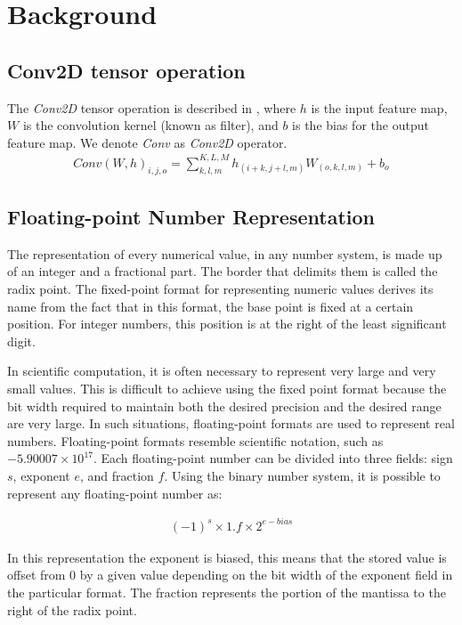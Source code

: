 \section{Background}
\label{sec:background}

\subsection{Conv2D tensor operation}
The \emph{Conv2D} tensor operation is described in , where $h$ is the input feature map, $W$ is the convolution kernel (known as filter), and $b$ is the bias for the output feature map\cite{goodfellow2016deep}. We denote \emph{Conv} as \emph{Conv2D} operator.
\begin{eqnarray} \label{eq:conv2D}
Conv\left(W,h\right)_{i,j,o}=\sum_{k,l,m}^{K,L,M} h_{(i+k,j+l,m)} W_{(o,k,l,m)}+b_{o}
\end{eqnarray}

\subsection{Floating-point Number Representation}
The representation of every numerical value, in any number system, is made up of an integer and a fractional part. The border that delimits them is called the radix point. The fixed-point format for representing numeric values derives its name from the fact that in this format, the base point is fixed at a certain position. For integer numbers, this position is at the right of the least significant digit.

In scientific computation, it is often necessary to represent very large and very small values. This is difficult to achieve using the fixed point format because the bit width required to maintain both the desired precision and the desired range are very large. In such situations, floating-point formats are used to represent real numbers. Floating-point formats resemble scientific notation, such as $-5.90007\times10^{17}$. Each floating-point number can be divided into three fields: sign $s$, exponent $e$, and fraction $f$. Using the binary number system, it is possible to represent any floating-point number as:

\begin{eqnarray} \label{eq:float}
(-1)^{s} \times 1.f \times 2^{e-bias}
\end{eqnarray}

In this representation the exponent is biased, this means that the stored value is offset from 0 by a given value depending on the bit width of the exponent field in the particular format. The fraction represents the portion of the mantissa to the right of the radix point.

